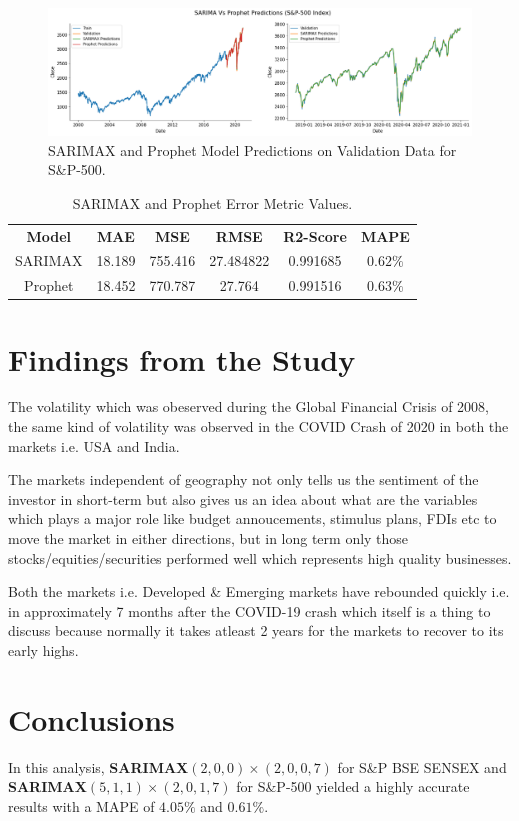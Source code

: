 \documentclass[conference]{IEEEtran}
\begin{document}
\begin{figure}[htbp]
	\centering
	\includegraphics[width = 0.50 \textwidth]{images/SARIMAX-Prophet-S&P-500-Predictions.png}
	\caption{SARIMAX and Prophet Model Predictions on Validation Data for S\&P-500.}
\end{figure}
\begin{table}[htbp]
	\centering
	\caption{SARIMAX and Prophet Error Metric Values.}
	\begin{tabular}{c c c c c c}
		\textbf{Model} & \textbf{MAE} & \textbf{MSE} & \textbf{RMSE} & \textbf{R2-Score} & \textbf{MAPE} \\
		SARIMAX        & 18.189       & 755.416      & 27.484822     & 0.991685          & $0.62 \%$     \\
		Prophet        & 18.452       & 770.787      & 27.764        & 0.991516          & $0.63\%$      \\
	\end{tabular}
\end{table}

\section{Findings from the Study}
The volatility which was obeserved during the Global Financial Crisis of 2008, the same kind of volatility was observed in the COVID Crash of 2020 in both the markets i.e. USA and India.

The markets independent of geography not only tells us the sentiment of the investor in short-term but also gives us an idea about what are the variables which plays a major role like budget annoucements, stimulus plans, FDIs etc to move the market in either directions, but in long term only those stocks/equities/securities performed well which represents high quality businesses.

Both the markets i.e. Developed \& Emerging markets have rebounded quickly i.e. in approximately 7 months after the COVID-19 crash which itself is a thing to discuss because normally it takes atleast 2 years for the markets to recover to its early highs.

\section{Conclusions}
In this analysis, \textbf{SARIMAX$(2, 0, 0) \times (2, 0, 0, 7)$} for S\&P BSE SENSEX and \textbf{SARIMAX$(5, 1, 1) \times (2, 0, 1, 7)$} for S\&P-500 yielded a highly accurate results with a MAPE of $4.05\%$ and $0.61\%$.
\end{document}
